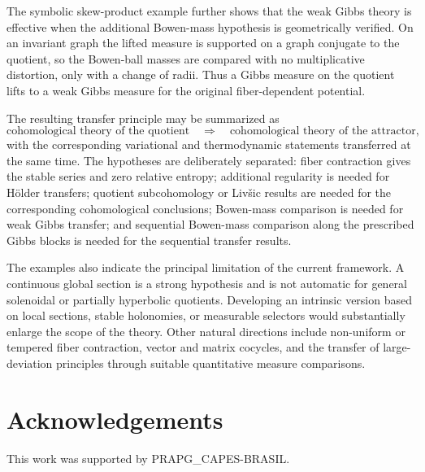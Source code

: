 \documentclass[11pt,a4paper]{article}
\begin{document}
The symbolic skew-product example further shows that the weak Gibbs theory
is effective when the additional Bowen-mass hypothesis is geometrically
verified. On an invariant graph the lifted measure is supported on a graph
conjugate to the quotient, so the Bowen-ball masses are compared with no
multiplicative distortion, only with a change of radii. Thus a Gibbs measure
on the quotient lifts to a weak Gibbs measure for the original
fiber-dependent potential.

The resulting transfer principle may be summarized as
\[
\boxed{
\text{cohomological theory of the quotient}
\quad\Longrightarrow\quad
\text{cohomological theory of the attractor},
}
\]
with the corresponding variational and thermodynamic statements transferred
at the same time. The hypotheses are deliberately separated: fiber
contraction gives the stable series and zero relative entropy; additional
regularity is needed for H\"older transfers; quotient subcohomology or
Liv\v{s}ic results are needed for the corresponding cohomological
conclusions; Bowen-mass comparison is needed for weak Gibbs transfer; and
sequential Bowen-mass comparison along the prescribed Gibbs blocks is needed
for the sequential transfer results.

The examples also indicate the principal limitation of the current
framework. A continuous global section is a strong hypothesis and is not
automatic for general solenoidal or partially hyperbolic quotients.
Developing an intrinsic version based on local sections, stable holonomies,
or measurable selectors would substantially enlarge the scope of the
theory. Other natural directions include non-uniform or tempered fiber
contraction, vector and matrix cocycles, and the transfer of large-deviation
principles through suitable quantitative measure comparisons.

\section*{Acknowledgements}
This work was supported by PRAPG\_CAPES-BRASIL.
\end{document}
